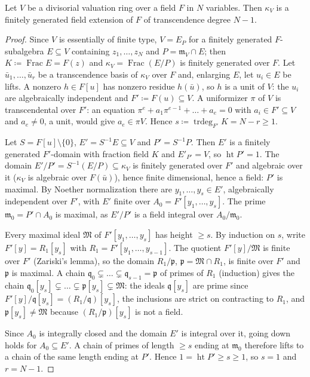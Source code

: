 \begin{lemma}\label{lem:c0-residue-trdeg}
\leanok
{}
Let $V$ be a divisorial valuation ring over a field $F$ in $N$ variables. Then $\kappa_V$ is a finitely
generated field extension of $F$ of transcendence degree $N-1$.
\end{lemma}

\begin{proof}
Since $V$ is essentially of finite type, $V=E_P$ for a finitely generated $F$-subalgebra $E\subseteq V$
containing $z_1,\dots,z_N$ and $P=\mathfrak m_V\cap E$; then $K\coloneqq\operatorname{Frac}E=F(z)$ and $\kappa_V=\operatorname{Frac}(E/P)$ is
finitely generated over $F$. Let $\bar u_1,\dots,\bar u_r$ be a transcendence basis of $\kappa_V$ over $F$ and,
enlarging $E$, let $u_i\in E$ be lifts. A nonzero $h\in F[u]$ has nonzero residue $h(\bar u)$, so $h$ is a unit
of $V$: the $u_i$ are algebraically independent and $F'\coloneqq F(u)\subseteq V$. A uniformizer $\pi$ of $V$ is
transcendental over $F'$: an equation $\pi^e+a_1\pi^{e-1}+\dots+a_e=0$ with $a_i\in F'\subseteq V$ and $a_e\ne0$, a unit,
would give $a_e\in\pi V$. Hence $s\coloneqq\operatorname{trdeg}_{F'}K=N-r\ge1$.

Let $S=F[u]\setminus\{0\}$, $E'=S^{-1}E\subseteq V$ and $P'=S^{-1}P$. Then $E'$ is a finitely generated $F'$-domain with
fraction field $K$ and $E'_{P'}=V$, so $\operatorname{ht}P'=1$. The domain $E'/P'=S^{-1}(E/P)\subseteq\kappa_V$ is finitely
generated over $F'$ and algebraic over it ($\kappa_V$ is algebraic over $F(\bar u)$), hence finite dimensional, hence a
field: $P'$ is maximal. By Noether normalization there are $y_1,\dots,y_s\in E'$, algebraically independent over $F'$,
with $E'$ finite over $A_0=F'[y_1,\dots,y_s]$. The prime $\mathfrak m_0=P'\cap A_0$ is maximal, as $E'/P'$ is a field integral
over $A_0/\mathfrak m_0$.

Every maximal ideal $\mathfrak M$ of $F'[y_1,\dots,y_s]$ has height $\ge s$. By induction on $s$, write
$F'[y]=R_1[y_s]$ with $R_1=F'[y_1,\dots,y_{s-1}]$. The quotient $F'[y]/\mathfrak M$ is finite over $F'$ (Zariski's lemma), so
the domain $R_1/\mathfrak p$, $\mathfrak p=\mathfrak M\cap R_1$, is finite over $F'$ and $\mathfrak p$ is maximal. A chain
$\mathfrak q_0\subsetneq\dots\subsetneq\mathfrak q_{s-1}=\mathfrak p$ of primes of $R_1$ (induction) gives the chain
$\mathfrak q_0[y_s]\subsetneq\dots\subsetneq\mathfrak p[y_s]\subsetneq\mathfrak M$: the ideals $\mathfrak q[y_s]$ are prime since
$F'[y]/\mathfrak q[y_s]=(R_1/\mathfrak q)[y_s]$, the inclusions are strict on contracting to $R_1$, and $\mathfrak p[y_s]\ne\mathfrak M$ because
$(R_1/\mathfrak p)[y_s]$ is not a field.

Since $A_0$ is integrally closed and the domain $E'$ is integral over it, going down holds for $A_0\subseteq E'$. A chain
of primes of length $\ge s$ ending at $\mathfrak m_0$ therefore lifts to a chain of the same length ending at $P'$. Hence
$1=\operatorname{ht}P'\ge s\ge1$, so $s=1$ and $r=N-1$.
\end{proof}

